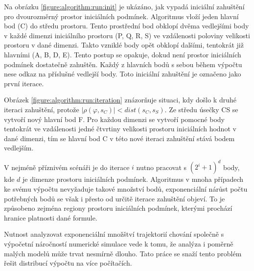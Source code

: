 Na obrázku \ref{figure:algorithm:run:init} je ukázáno, jak vypadá iniciální zahuštění
pro dvourozměrný prostor iniciálních podmínek. Algoritmus vloží jeden hlavní bod (C) do středu prostoru. 
Tento prostřední bod obklopí dvěma vedlejšími body v každé dimenzi iniciálního prostoru (P, Q, R, S) ve vzdálenosti
poloviny velikosti prostoru v dané dimenzi. Takto vzniklé body opět obklopí dalšími, tentokrát již hlavními (A, B, D, E).
Tento postup se opakuje, dokud není prostor iniciálních podmínek dostatečně zahuštěn.
Každý z hlavních bodů s sebou během výpočtu nese odkaz na příslušné vedlejší body.
Toto iniciální zahuštění je označeno jako první iterace.

Obrázek \ref{figure:algorithm:run:iteration} znázorňuje situaci, kdy došlo k druhé iteraci zahuštění,
pro\-tože $\big|\rho(\varphi, s_C)\big| < dist(s_C, s_S)$. Ze středu úsečky CS se vytvoří
nový hlavní bod F. Pro každou dimenzi se vytvoří pomocné body tentokrát ve vzdá\-le\-nosti jedné čtvrtiny
velikosti prostoru iniciálních hodnot v dané dimenzi, tím se hlavní bod C v této
nové iteraci zahuštění stává bodem vedlejším.

V nejméně příznivém scénáři je do iterace $i$ nutno pracovat s $(2^i + 1)^d$ body,
kde $d$ je dimenze prostoru iniciálních podmínek. Algoritmus v mnoha případech
ke svému výpočtu nevyžaduje takové množství bodů, expo\-nen\-ciál\-ní nárůst počtu
potřebných bodů se však i přesto od určitě iterace za\-huš\-tě\-ní objeví. To je způsobeno
zejména regiony prostoru iniciálních podmínek, kterými prochází hranice platnosti dané formule.

Nutnost analyzovat exponenciální množštví trajektorií chování společně s
výpočetní náročností numerické simulace vede k tomu, že analýza i po\-měr\-ně
malých modelů může trvat nesmírně dlouho. Tato práce se snaží tento problém řešit
distribucí výpočtu na více počítačích.
